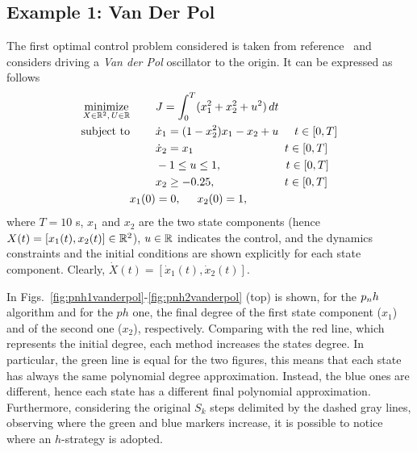\subsection*{Example 1: Van Der Pol}
The first optimal control problem considered is taken from reference~\cite{casadi:DOC:2018} and considers
driving a \emph{Van der Pol} oscillator to the origin. It can be expressed as follows
\begin{subequations}\label{eq:vanderpol}
	\begin{align}
	\underset{X \in \mathbb{R}^{2}, \, U \in \mathbb{R}}{\text{minimize}}\hspace{8mm}
	&J = \int_{0}^{T}(x_1^{2} + x_2^{2} + u^{2})\,dt  \label{eq:vancost}\\
	\text{subject to} \hspace{8mm}
	& \dot{x}_1 = (1 - x_2^{2})x_{1} - x_2 + u \hspace{5mm} t \in[0,T] \label{eq:vandyn1}\\
	& \dot{x}_2 = x_1 \hspace{28.5mm} t \in[0,T] \label{eq:vandyn2}\\
	& -1  \leq u \leq 1,  \hspace{20mm} t \in[0,T] \label{eq:vanpath1}\\
	& x_2 \geq -0.25,  \hspace{21.5mm} t \in[0,T] \label{eq:vanpath2}\\
	 x_1(0) &= 0, \hspace{5mm} x_2(0) = 1, \label{eq:initial1}\\		
	\end{align}
\end{subequations}
where $T = 10$ s, $x_1$ and $x_2$ are the two state components (hence $X(t) = [x_1(t), x_2(t)]\in \mathbb{R}^2$), $u\in\mathbb{R}$ indicates the control, and the dynamics constraints and the initial conditions are shown explicitly for each state component. Clearly, $\dot{X}(t) = [\dot{x}_1(t), \dot{x}_2(t)]$.

In Figs.~\ref{fig:pnh1vanderpol}-\ref{fig:pnh2vanderpol} (top) is shown, for the $p_{n}h$ algorithm and for the $ph$ one, the final degree of the first state component ($x_1$) and of the second one ($x_2$), respectively. Comparing with the red line, which represents the initial degree, each method increases the states degree. In particular, the green line is equal for the two figures, this means that each state has always the same polynomial degree approximation. Instead, the blue ones are different, hence each state has a different final polynomial approximation. Furthermore, considering the original $S_k$ steps delimited by the dashed gray lines, observing where the green and blue markers increase, it is possible to notice where an $h$-strategy is adopted.

